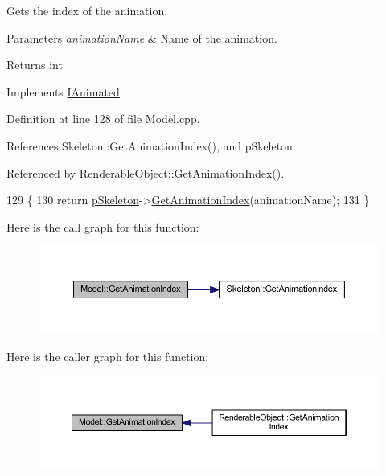 Gets the index of the animation. 


\begin{DoxyParams}{Parameters}
{\em animation\+Name} & Name of the animation.\\
\hline
\end{DoxyParams}
\begin{DoxyReturn}{Returns}
int
\end{DoxyReturn}


Implements \hyperlink{class_i_animated_a33e7b0dd04727e5dc9311c60730ad6e5}{I\+Animated}.



Definition at line 128 of file Model.\+cpp.



References Skeleton\+::\+Get\+Animation\+Index(), and p\+Skeleton.



Referenced by Renderable\+Object\+::\+Get\+Animation\+Index().


\begin{DoxyCode}
129 \{
130   \textcolor{keywordflow}{return} \hyperlink{class_model_a2318827a9c98ccd63bfbbb0f3ac84b8a}{pSkeleton}->\hyperlink{class_skeleton_a1d805e4a364116706ff9c2ba3072d527}{GetAnimationIndex}(animationName);
131 \}
\end{DoxyCode}


Here is the call graph for this function\+:\nopagebreak
\begin{figure}[H]
\begin{center}
\leavevmode
\includegraphics[width=350pt]{class_model_a42eaac921087da9ba23a8700d9795db7_cgraph}
\end{center}
\end{figure}




Here is the caller graph for this function\+:\nopagebreak
\begin{figure}[H]
\begin{center}
\leavevmode
\includegraphics[width=350pt]{class_model_a42eaac921087da9ba23a8700d9795db7_icgraph}
\end{center}
\end{figure}


